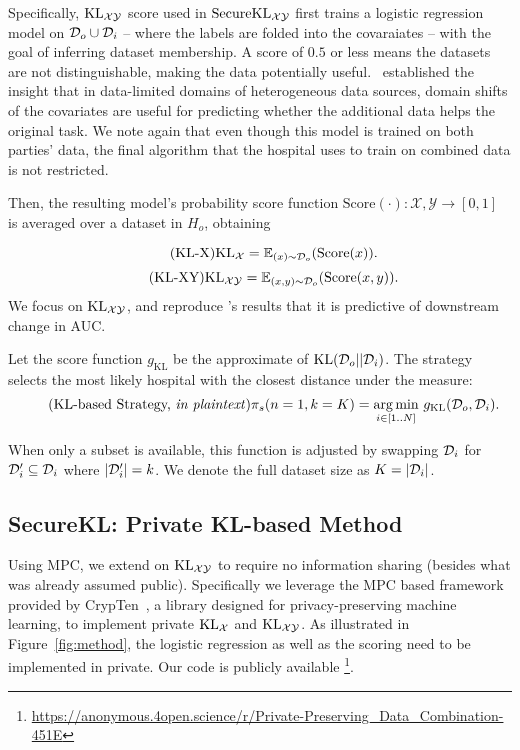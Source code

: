 Specifically, $\mathrm{KL}_{\mathcal{X}\mathcal{Y}}$ score used in $\mathrm{Secure}\mathrm{KL}_{\mathcal{X}\mathcal{Y}}$ first trains a logistic regression model \cite{Cox1958TheRA} on $\mathcal{D}_o \cup \mathcal{D}_i$ -- where the labels are folded into the covaraiates -- with the goal of inferring dataset membership.
A score of $0.5$ or less means the datasets are not distinguishable, making the data potentially useful. 
~\priorp established the insight that in data-limited domains of heterogeneous data sources, domain shifts of the covariates are useful for predicting whether the additional data helps the original task.
We note again that even though this model is trained on both parties' data, the final algorithm that the hospital uses to train on combined data is not restricted.

Then, the resulting model's probability score function $\text{Score}(\cdot): \mathcal{X, Y} \to [0,1]$ is averaged over a dataset in $H_o$, obtaining
  
\begin{equation}
\tag{KL-X}
\mathrm{KL}_\mathcal{X} = \mathbb{E}_{(x)\sim \mathcal{D}_o}(\text{Score}(x)).
\end{equation} 
\begin{equation}
\tag{KL-XY}
\mathrm{KL}_{\mathcal{X}\mathcal{Y}} = \mathbb{E}_{(x,y)\sim \mathcal{D}_o}(\text{Score}(x, y)).
\end{equation} 
We focus on $\mathrm{KL}_{\mathcal{X}\mathcal{Y}}$, and reproduce \priorp's results that it is predictive of downstream change in AUC.

Let the score function $g_\mathrm{KL}$ be the approximate of $ \mathrm{KL}(\mathcal{D}_o||\mathcal{D}_i)$. The strategy selects the most likely hospital with the closest distance under the measure:
\begin{equation}
\tag{KL-based Strategy, \emph{in plaintext}}
\pi_s (n=1, k=K) = \argmin _{i\in [1..N]} \, g_\mathrm{KL}(\Do,\Di).
\end{equation}

When only a subset is available, this function is adjusted by swapping $\mathcal{D}_i$ for $\mathcal{D}_i' \subseteq \mathcal{D}_i$ where $|\mathcal{D}_i'| = k$. We denote the full dataset size as $K=|\mathcal{D}_i|$.

\subsection{SecureKL: Private KL-based Method}
Using MPC, we extend on $\mathrm{KL}_{\mathcal{X}\mathcal{Y}}$ to require no information sharing (besides what was already assumed public).
Specifically we leverage the MPC based framework provided by CrypTen~\cite{knott2021crypten}, a library designed for privacy-preserving machine learning, to implement private $\mathrm{KL}_\mathcal{X}$ and $\mathrm{KL}_{\mathcal{X}\mathcal{Y}}$. As illustrated in Figure~\ref{fig:method}, the logistic regression as well as the scoring need to be implemented in private. Our code is publicly available \footnote{\url{https://anonymous.4open.science/r/Private-Preserving_Data_Combination-451E}}.

